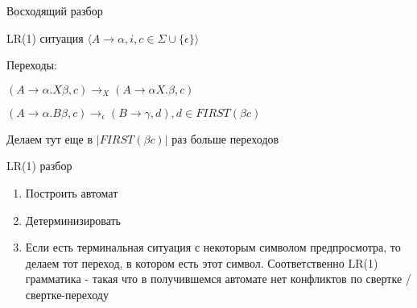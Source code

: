 \begin{para}{Восходящий разбор}
\begin{defe}{LR(1) ситуация}
$\langle A \rightarrow \alpha, i, c \in \Sigma \cup \{ \epsilon \} \rangle$

\end{defe}

Переходы:

$(A \rightarrow \alpha . X \beta, c) \rightarrow_X (A \rightarrow \alpha X . \beta, c)$

$(A \rightarrow \alpha . B \beta, c) \rightarrow_\epsilon (B \rightarrow \gamma, d), d \in FIRST(\beta c)$

Делаем тут еще в $|FIRST(\beta c)|$ раз больше переходов


\begin{defe}{LR(1) разбор}

\begin{enumerate}

  \item Построить автомат

  \item Детерминизировать

  \item Если есть терминальная ситуация с некоторым символом предпросмотра, то делаем тот переход, в котором есть этот символ. Соответственно LR(1) грамматика - такая что в получившемся автомате нет конфликтов по свертке / свертке-переходу
  
\end{enumerate}

\end{defe}

\end{para}




